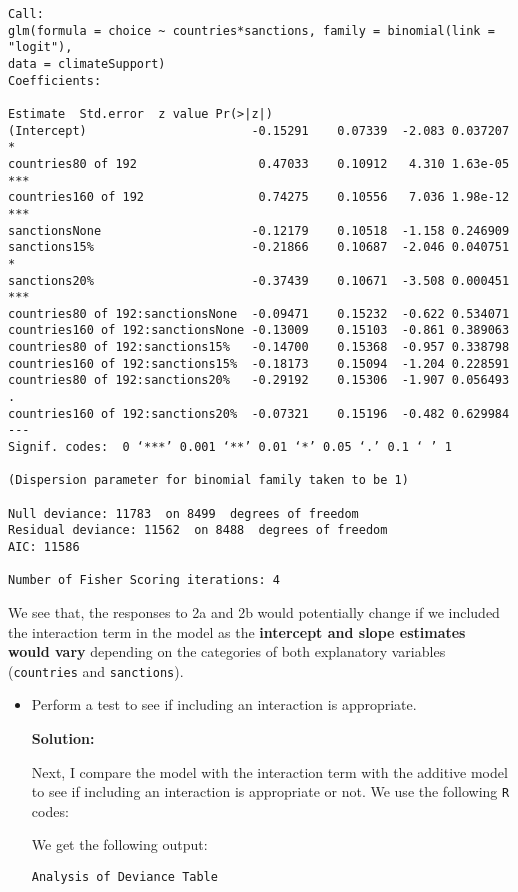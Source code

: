 \documentclass[12pt,letterpaper]{article}
\begin{document}
\begin{enumerate}
\begin{enumerate}
\begin{verbatim}
Call:
glm(formula = choice ~ countries*sanctions, family = binomial(link = "logit"), 
data = climateSupport)
Coefficients:
							 																								  Estimate  Std.error  z value Pr(>|z|)    
(Intercept)                       -0.15291    0.07339  -2.083 0.037207 *  
countries80 of 192                 0.47033    0.10912   4.310 1.63e-05 ***
countries160 of 192                0.74275    0.10556   7.036 1.98e-12 ***
sanctionsNone                     -0.12179    0.10518  -1.158 0.246909    
sanctions15%                      -0.21866    0.10687  -2.046 0.040751 *  
sanctions20%                      -0.37439    0.10671  -3.508 0.000451 ***
countries80 of 192:sanctionsNone  -0.09471    0.15232  -0.622 0.534071    
countries160 of 192:sanctionsNone -0.13009    0.15103  -0.861 0.389063    
countries80 of 192:sanctions15%   -0.14700    0.15368  -0.957 0.338798    
countries160 of 192:sanctions15%  -0.18173    0.15094  -1.204 0.228591    
countries80 of 192:sanctions20%   -0.29192    0.15306  -1.907 0.056493 .  
countries160 of 192:sanctions20%  -0.07321    0.15196  -0.482 0.629984    
---
Signif. codes:  0 ‘***’ 0.001 ‘**’ 0.01 ‘*’ 0.05 ‘.’ 0.1 ‘ ’ 1

(Dispersion parameter for binomial family taken to be 1)

Null deviance: 11783  on 8499  degrees of freedom
Residual deviance: 11562  on 8488  degrees of freedom
AIC: 11586	

Number of Fisher Scoring iterations: 4
\end{verbatim}

We see that, the responses to 2a and 2b would potentially change if we included the interaction term in the model as the \textbf{intercept and slope estimates would vary} depending on the categories of both explanatory variables (\texttt{countries} and \texttt{sanctions}).
		
\begin{itemize}
\item Perform a test to see if including an interaction is appropriate.
			
\vspace*{.2cm}
\noindent\textbf{Solution:}

Next, I compare the model with the interaction term with the additive model to see if including an interaction is appropriate or not. We use the following \texttt{R} codes:


We get the following output:
\begin{Verbatim}
Analysis of Deviance Table


\end{Verbatim}
\end{itemize}
\end{enumerate}
\end{enumerate}
\end{document}
